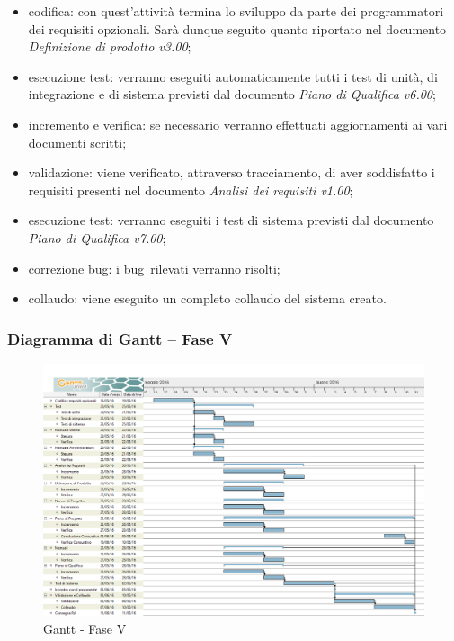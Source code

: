 \documentclass[../PianoProgetto.tex]{subfiles}
\begin{document}
		\begin{itemize}
		
				\item codifica: con quest'attività termina lo sviluppo da parte dei programmatori dei requisiti opzionali. Sarà dunque seguito quanto riportato nel documento \textit{Definizione di prodotto v3.00};
				\item esecuzione test: verranno eseguiti automaticamente tutti i test di unità, di integrazione e di sistema previsti dal documento \textit{Piano di Qualifica v6.00};
				
				\item incremento e verifica: se necessario verranno effettuati aggiornamenti ai vari documenti scritti;

				\item validazione: viene verificato, attraverso tracciamento, di aver soddisfatto i requisiti presenti nel documento \textit{Analisi dei requisiti v1.00};

				\item esecuzione test: verranno eseguiti i test di sistema previsti dal documento \textit{Piano di Qualifica v7.00};

				\item correzione bug\g : i bug\g\ rilevati verranno risolti;

				\item collaudo: viene eseguito un completo collaudo del sistema creato.
		\end{itemize}
		
		\subsubsection{Diagramma di Gantt – Fase V}
			\begin{figure}[!h]
				\centering
				\includegraphics[width=\textwidth]{gantt_png/7-verifica}
				\caption{Gantt - Fase V}
				\label{fig:Gantt - Fase V}
			\end{figure}
			
\end{document}
